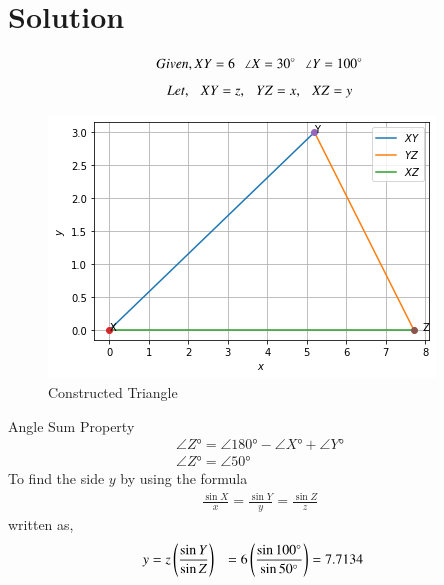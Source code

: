 \documentclass[journal,12pt,twocolumn]{IEEEtran}
\begin{document}
\section{Solution}
%
\begin{equation}
               Given, XY=6 \hspace{0.25cm} \angle X=30\si{\degree}  \hspace{0.25cm} \angle Y=100\si{\degree}
\end{equation}
%
\begin{align}
Let, \hspace{0.25cm} XY=z, \hspace{0.25cm} YZ=x, \hspace{0.25cm} XZ=y
\end{align}
%
\begin{figure}[!b]
 \centering
           \includegraphics[width=\columnwidth]{Figure_1.png}
           \caption{Constructed Triangle}
           \label{Figure}
\end{figure}
%
Angle  Sum  Property
%
\begin{align}
             \angle Z\si{\degree} = \angle 180\si{\degree} - \angle X\si{\degree} + \angle Y\si{\degree}\\
             \angle Z\si{\degree} = \angle 50\si{\degree}
\end{align}
%
To find the side $y$ by using the formula
%
\begin{align}
\frac{\sin{X}}{x} = \frac{\sin{Y}}{y} = \frac{\sin{Z}}{z}
\end{align}
%
written as,
%
\begin{align}
y&= z\left(\frac{\sin{Y}}{\sin{Z}}\right) 
&= 6 \left(\frac{\sin{\ang{100}}}{\sin{\ang{50}}}\right)
&= 7.7134
\end{align}
\end{document}
